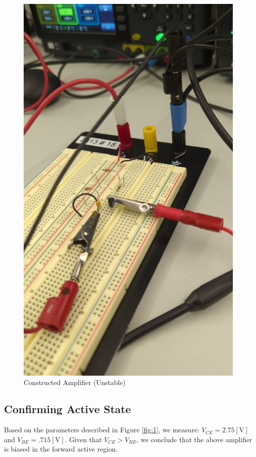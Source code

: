 \documentclass[
	letterpaper, %
	10pt, %
]{CSUniSchoolLabReport}
\begin{document}
\begin{figure}[H]
  \centering
  \includegraphics[width=.9\textwidth]{Figures/L4F1}
  \caption{Constructed Amplifier (Unstable)}
  \label{fig:2}
\end{figure}

\subsection{Confirming Active State}

Based on the parameters described in Figure \ref{fig:1}, we measure: $V_{CE}=2.75[\si{\volt}]$ and $V_{BE}=.715[\si{\volt}]$. Given that $V_{CE}>V_{BE}$, we conclude that the above amplifier is biased in the forward active region.
\end{document}
